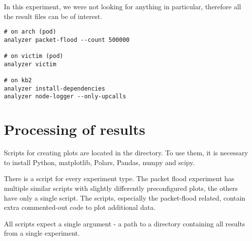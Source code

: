 In this experiment, we were not looking for anything in particular, therefore all the result files can be of interest.

\begin{verbatim}
# on arch (pod)
analyzer packet-flood --count 500000

# on victim (pod)
analyzer victim

# on kb2
analyzer install-dependencies
analyzer node-logger --only-upcalls
\end{verbatim}

\section{Processing of results}

Scripts for creating plots are located in the  directory. To use them, it is necessary to install Python, matplotlib, Polars, Pandas, numpy and scipy.

There is a script for every experiment type. The packet flood experiment has multiple similar scripts with slightly differently preconfigured plots, the others have only a single script. The scripts, especially the packet-flood related, contain extra commented-out code to plot additional data.

All scripts expect a single argument - a path to a directory containing all results from a single experiment.